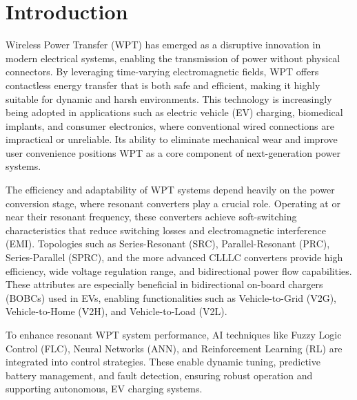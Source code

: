 \documentclass[12pt,a4paper]{report}
\begin{document}
\titlespacing*{\chapter}{-40pt}{-60pt}{-000pt} %


           \chapter{ Introduction}

\vspace{2cm}
             
\quad Wireless Power Transfer (WPT) has emerged as a disruptive innovation in modern electrical systems, enabling the transmission of power without physical connectors. By leveraging time-varying electromagnetic fields, WPT offers contactless energy transfer that is both safe and efficient, making it highly suitable for dynamic and harsh environments. This technology is increasingly being adopted in applications such as electric vehicle (EV) charging, biomedical implants, and consumer electronics, where conventional wired connections are impractical or unreliable. Its ability to eliminate mechanical wear and improve user convenience positions WPT as a core component of next-generation power systems.\cite{erickson2020resonant}

 

\quad The efficiency and adaptability of WPT systems depend heavily on the power conversion stage, where resonant converters play a crucial role. Operating at or near their resonant frequency, these converters achieve soft-switching characteristics that reduce switching losses and electromagnetic interference (EMI). Topologies such as Series-Resonant (SRC), Parallel-Resonant (PRC), Series-Parallel (SPRC), and the more advanced CLLLC converters provide high efficiency, wide voltage regulation range, and bidirectional power flow capabilities. These attributes are especially beneficial in bidirectional on-board chargers (BOBCs) used in EVs, enabling functionalities such as Vehicle-to-Grid (V2G), Vehicle-to-Home (V2H), and Vehicle-to-Load (V2L).\cite{li2022singleended}\cite{irivennela2020wireless}\cite{erickson2020resonant}\cite{lin2021analysis}
 

\quad To enhance resonant WPT system performance, AI techniques like Fuzzy Logic Control (FLC), Neural Networks (ANN), and Reinforcement Learning (RL) are integrated into control strategies. These enable dynamic tuning, predictive battery management, and fault detection, ensuring robust operation and supporting autonomous,  EV charging systems.\cite{irivennela2020wireless}
\end{document}
